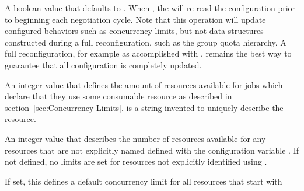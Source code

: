 \begin{description}
\label{param:NegotiatorReadConfigBeforeCycle}
\item[\Macro{NEGOTIATOR\_READ\_CONFIG\_BEFORE\_CYCLE}]
  A boolean value that defaults to .
  When , the  will re-read the configuration
  prior to beginning each negotiation cycle.  
  Note that this operation will update configured behaviors such as 
  concurrency limits, but not data structures
  constructed during a full reconfiguration,
  such as the group quota hierarchy.
  A full reconfiguration, for example as accomplished with ,
  remains the best way to 
  guarantee that all  configuration is completely updated.

\label{param:NameLimit}
\item[\Macro{<NAME>\_LIMIT}]
  An integer value that defines the amount of resources available for
  jobs which declare that they use some consumable resource 
  as described in section~\ref{sec:Concurrency-Limits}. 
   is a string invented to uniquely describe the resource.

\label{param:ConcurrencyLimitDefault}
\item[\Macro{CONCURRENCY\_LIMIT\_DEFAULT}]
  An integer value that describes the number of resources available for
  any resources that are not explicitly named defined with the
  configuration variable .
  If not defined, no limits are set for resources not explicitly identified
  using .

\label{param:ConcurrencyLimitDefaultName}
\item[\Macro{CONCURRENCY\_LIMIT\_DEFAULT\_<NAME>}]
	If set, this defines a default concurrency limit for all resources
that start with 

\end{description}

